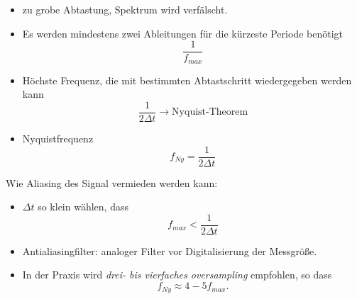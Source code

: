 \begin{itemize}
\item zu grobe Abtastung, Spektrum wird verfälscht.
\item Es werden mindestens zwei Ableitungen für die kürzeste Periode benötigt
\[
\frac{1}{f_{max}}
\]
\item Höchste Frequenz, die mit bestimmten Abtastschritt wiedergegeben werden kann
\[
\frac{1}{2\Delta t} \rightarrow \mbox{Nyquist-Theorem}
\]
\item Nyquistfrequenz
\[
f_{Ny}=\frac{1}{2 \Delta t}
\]
\end {itemize}
Wie Aliasing des Signal vermieden werden kann:
\begin{itemize}
\item $\Delta t$ so klein wählen, dass
\[
f_{max} < \frac {1}{2\Delta t}
\]
\item Antialiasingfilter: analoger Filter vor Digitalisierung der Messgröße.
\item In der Praxis wird \textit{drei- bis vierfaches oversampling} empfohlen, so dass
\[
f_{Ny}\approx 4-5 f_{max}.
\]
\end {itemize}